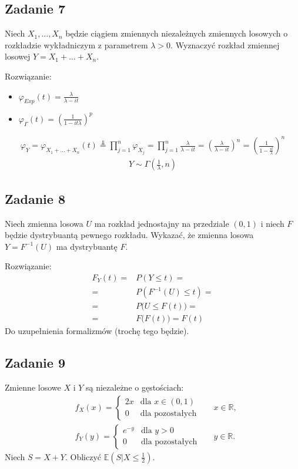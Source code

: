 \newpage
\subsection*{Zadanie 7}
Niech $ X_1,\dots,X_n$ będzie ciągiem zmiennych niezależnych zmiennych losowych o rozkładzie wykładniczym z parametrem $ \lambda>0 $. Wyznaczyć rozkład zmiennej losowej $ Y=X_1+\dots+X_n $.

Rozwiązanie:
\begin{itemize}
\item $ \varphi_{Exp}(t)=\frac{\lambda}{\lambda-it} $
\item $ \varphi_{\Gamma}(t)=\left(\frac{1}{1-it\lambda}\right)^p$
\end{itemize}
\begin{gather*}
\varphi_{Y}=\varphi_{X_1+\dots+X_n}(t)\stackrel{\Perp}{=}
\prod_{j=1}^{n}\varphi_{X_j}
=
\prod_{j=1}^{n}\frac{\lambda}{\lambda-it}
=
\left(\frac{\lambda}{\lambda-it}\right)^n
=
\left(\frac{1}{1-\frac{it}{\lambda}}\right)^n
\end{gather*}
\begin{gather*}
Y\sim \Gamma\left(\tfrac{1}{\lambda},n\right)
\end{gather*}


\subsection*{Zadanie 8}
Niech zmienna losowa $ U $ ma rozkład jednostajny na przedziale $ (0,1) $ i niech $ F $ będzie dystrybuantą pewnego rozkładu. Wykazać, że zmienna losowa $ Y=F^{-1}(U) $ ma dystrybuantę $ F $.

Rozwiązanie:
\begin{align*}
F_Y(t)
=&
P\left(Y\le t\right)
=\\=&
P\left(F^{-1}(U)\le t\right)
=\\=&
P\bigl(U\le F(t)\bigr)
=\\=&
F\bigl(F(t)\bigr)=F(t)
\end{align*}
Do uzupełnienia formalizmów (trochę tego będzie).


\subsection*{Zadanie 9}
Zmienne losowe $ X $ i $ Y $ są niezależne o gęstościach:
\begin{align*}
&f_X(x)=\left \{
\begin{array}{cl}
	2x & \text{dla }x\in(0,1)   \\
	0  & \text{dla pozostałych}
\end{array}
\right .
&&x\in \mathbb R, \\
&f_Y(y)=\left \{
\begin{array}{cl}
	e^{-y} & \text{dla }y>0         \\
	  0    & \text{dla pozostałych}
\end{array}
\right .
&&y\in \mathbb R.
\end{align*}
Niech $ S=X+Y $. Obliczyć $ \mathbb E \left(S|X\le\frac{1}{2}\right) $.

